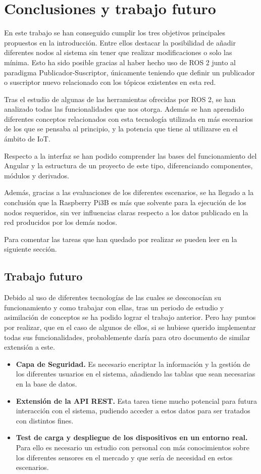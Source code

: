 \chapter{Conclusiones y trabajo futuro}

En este trabajo se han conseguido cumplir los tres objetivos principales propuestos en la introducción. Entre ellos destacar la posibilidad de añadir diferentes nodos al sistema sin tener que realizar modificaciones o solo las mínima. Esto ha sido posible gracias al haber hecho uso de ROS 2 junto al paradigma Publicador-Suscriptor, únicamente teniendo que definir un publicador o suscriptor nuevo relacionado con los tópicos existentes en esta red.

Tras el estudio de algunas de las herramientas ofrecidas por ROS 2, se han analizado todas las funcionalidades que nos otorga. Además se han aprendido diferentes conceptos relacionados con esta tecnología utilizada en más escenarios de los que se pensaba al principio, y la potencia que tiene al utilizarse en el ámbito de IoT.

Respecto a la interfaz se han podido comprender las bases del funcionamiento del Angular y la estructura de un proyecto de este tipo, diferenciando componentes, módulos y derivados.

Además, gracias a las evaluaciones de los diferentes escenarios, se ha llegado a la conclusión que la Raspberry Pi3B es más que solvente para la ejecución de los nodos requeridos, sin ver influencias claras respecto a los datos publicado en la red producidos por los demás nodos.

Para comentar las tareas que han quedado por realizar se pueden leer en la siguiente sección.

\section{Trabajo futuro}

Debido al uso de diferentes tecnologías de las cuales se desconocían su funcionamiento y como trabajar con ellas, tras un periodo de estudio y asimilación de conceptos se ha podido lograr el trabajo anterior. Pero hay puntos por realizar, que en el caso de algunos de ellos, si se hubiese querido implementar todas sus funcionalidades, probablemente daría para otro documento de similar extensión a este.

\begin{itemize}
    \item \textbf{Capa de Seguridad.} Es necesario encriptar la información y la gestión de los diferentes usuarios en el sistema, añadiendo las tablas que sean necesarias en la base de datos.
    \item \textbf{Extensión de la API REST.} Esta tarea tiene mucho potencial para futura interacción con el sistema, pudiendo acceder a estos datos para ser tratados con distintos fines.
    \item \textbf{Test de carga y despliegue de los dispositivos en un entorno real.} Para ello es necesario un estudio con personal con más conocimientos sobre los diferentes sensores en el mercado y que sería de necesidad en estos escenarios.
\end{itemize}

